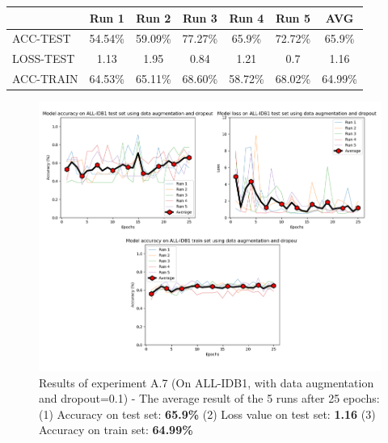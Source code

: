 \documentclass[11pt, openany]{report}
\theoremstyle{plain}
\theoremstyle{definition}
\theoremstyle{remark}
\begin{document}
\begin{center}
\begin{tabular}{|l|c|c|c|c|c|c|}
  \hline
   & \textbf{Run 1} & \textbf{Run 2} & \textbf{Run 3} & \textbf{Run 4} & \textbf{Run 5} & \textbf{AVG}\\
  \hline
  ACC-TEST & 54.54\% & 59.09\% & 77.27\% & 65.9\% & 72.72\% & 65.9\% \\
  LOSS-TEST & 1.13 & 1.95 & 0.84 & 1.21 & 0.7 & 1.16 \\ 
  ACC-TRAIN & 64.53\% & 65.11\% & 68.60\% & 58.72\% & 68.02\% & 64.99\% \\ 
  \hline
\end{tabular}
\label{table:results-A7}
\end{center}


\begin{figure}[H]
  \centering
  \includegraphics[scale=0.4]{Code/ch6-LeukemiaSubtypes/figures_result/ALL_IDB1/all_idb1-data_aug_dropout.PNG}
  \caption{Results of experiment A.7 (On ALL-IDB1, with data augmentation and dropout=0.1) - The average result of the 5 runs after 25 epochs: (1) Accuracy on test set: \textbf{65.9\%} (2) Loss value on test set: \textbf{1.16} (3) Accuracy on train set: \textbf{64.99\%}}
  \label{fig:results-A7}
\end{figure}
\end{document}
